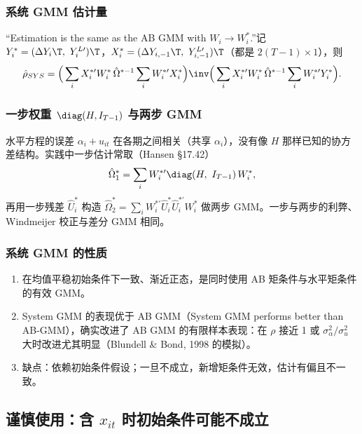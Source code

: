 \subsubsection{系统 GMM 估计量}

“Estimation is the same as the AB GMM with $W_i\to W_i^*$.”记 $Y_i^*=(\Delta Y_i\T,\ Y_i^{L\prime})\T$，$X_i^*=(\Delta Y_{i,-1}\T,\ Y_{i,-1}^{L\prime})\T$（都是 $2(T-1)\times1$），则
\[
\hat\rho_{SYS}=\Big(\sum_iX_i^{*\prime}W_i^*\,\hat\Omega^{*-1}\sum_iW_i^{*\prime}X_i^*\Big)\inv\Big(\sum_iX_i^{*\prime}W_i^*\,\hat\Omega^{*-1}\sum_iW_i^{*\prime}Y_i^*\Big).
\]

\subsubsection{一步权重 \texorpdfstring{$\diag(H,I_{T-1})$}{diag(H,I)} 与两步 GMM}

水平方程的误差 $\alpha_i+u_{it}$ 在各期之间相关（共享 $\alpha_i$），没有像 $H$ 那样已知的协方差结构。实践中一步估计常取（Hansen §17.42）
\[
\hat\Omega_1^*=\sum_iW_i^{*\prime}\diag(H,\ I_{T-1})\,W_i^*,
\]
再用一步残差 $\hat U_i^*$ 构造 $\hat\Omega_2^*=\sum_iW_i^{*\prime}\hat U_i^*\hat U_i^{*\prime}W_i^*$ 做两步 GMM。一步与两步的利弊、Windmeijer 校正与差分 GMM 相同。

\subsubsection{系统 GMM 的性质}

\begin{thm}\label{thm:U12b-sysprop}
\begin{enumerate}
  \item 在均值平稳初始条件下一致、渐近正态，是同时使用 AB 矩条件与水平矩条件的有效 GMM。
  \item System GMM 的表现优于 AB GMM（System GMM performs better than AB-GMM），确实改进了 AB GMM 的有限样本表现：在 $\rho$ 接近 1 或 $\sigma_\alpha^2/\sigma_u^2$ 大时改进尤其明显（Blundell \& Bond, 1998 的模拟）。
  \item 缺点：依赖初始条件假设；一旦不成立，新增矩条件无效，估计有偏且不一致。
\end{enumerate}
\end{thm}

\subsection{谨慎使用：含 \texorpdfstring{$x_{it}$}{x\_it} 时初始条件可能不成立}

